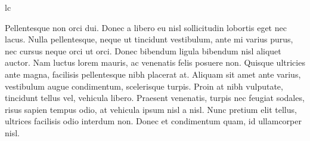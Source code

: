 \documentclass{article}
\begin{document}
lc
\newpage

\beginnumbering

\pstart
Pellentesque non orci dui. Donec a libero eu nisl sollicitudin lobortis eget nec lacus. Nulla pellentesque, neque ut tincidunt vestibulum, ante mi varius purus, nec cursus neque orci ut orci. Donec bibendum ligula bibendum nisl aliquet auctor. Nam luctus lorem mauris, ac venenatis felis posuere non. Quisque ultricies ante magna, facilisis pellentesque nibh placerat at. Aliquam sit amet ante varius, vestibulum augue condimentum, scelerisque turpis. Proin at nibh vulputate, tincidunt tellus vel, vehicula libero. Praesent venenatis, turpis nec feugiat sodales, risus sapien tempus odio, at vehicula ipsum nisl a nisl. Nunc pretium elit tellus, ultrices facilisis odio interdum non. Donec et condimentum quam, id ullamcorper nisl.
\pend

\end{document}
